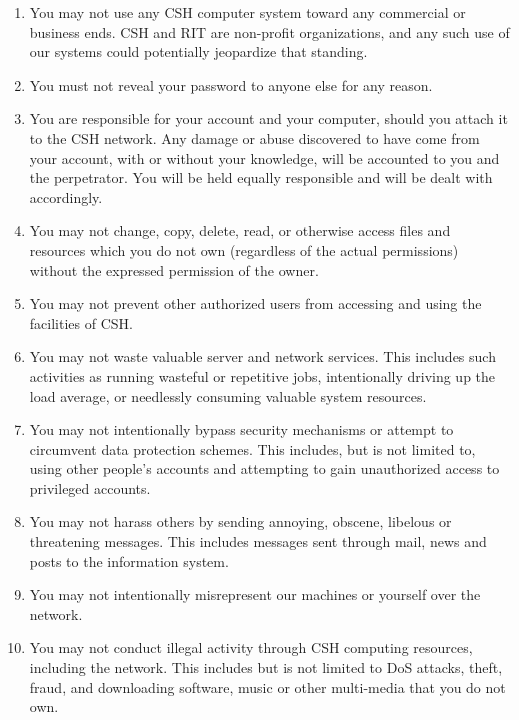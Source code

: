 \documentclass{article}
\begin{document}
\begin{enumerate}[I]
\item You may not use any CSH computer system toward any commercial or business
ends. CSH and RIT are non-profit organizations, and any such use of our systems
could potentially jeopardize that standing.

\item You must not reveal your password to anyone else for any reason.

\item You are responsible for your account and your computer, should you attach
it to the CSH network. Any damage or abuse discovered to have come from your
account, with or without your knowledge, will be accounted to you and the
perpetrator. You will be held equally responsible and will be dealt with
accordingly.

\item You may not change, copy, delete, read, or otherwise access files and
resources which you do not own (regardless of the actual permissions) without
the expressed permission of the owner.

\item You may not prevent other authorized users from accessing and using the
facilities of CSH.

\item You may not waste valuable server and network
services. This includes such activities as running wasteful or repetitive jobs,
intentionally driving up the load average, or needlessly consuming valuable
system resources.

\item You may not intentionally bypass security mechanisms or attempt to
circumvent data protection schemes. This includes, but is not limited to, using
other people’s accounts and attempting to gain unauthorized access to privileged
accounts.

\item You may not harass others by sending annoying, obscene, libelous or
threatening messages. This includes messages sent through mail, news and posts
to the information system.

\item You may not intentionally misrepresent our machines or yourself over the
network.

\item You may not conduct illegal activity through CSH computing resources,
including the network. This includes but is not limited to DoS attacks, theft,
fraud, and downloading software, music or other multi-media that you do not own.


\end{enumerate}
\end{document}
